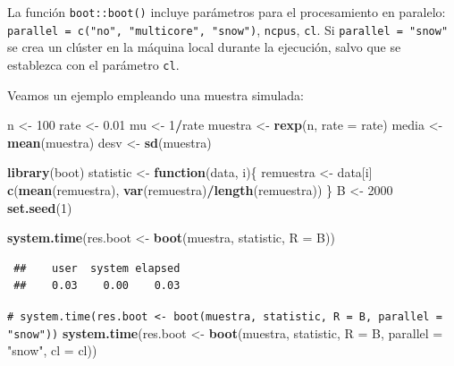 \documentclass[
  spanish,
  10pt,
]{book}
\newenvironment{Shaded}{\begin{snugshade}}{\end{snugshade}}
\newcommand{\AttributeTok}[1]{\textcolor[rgb]{0.13,0.29,0.53}{#1}}
\newcommand{\CommentTok}[1]{\textcolor[rgb]{0.56,0.35,0.01}{\textit{#1}}}
\newcommand{\ControlFlowTok}[1]{\textcolor[rgb]{0.13,0.29,0.53}{\textbf{#1}}}
\newcommand{\DecValTok}[1]{\textcolor[rgb]{0.00,0.00,0.81}{#1}}
\newcommand{\FloatTok}[1]{\textcolor[rgb]{0.00,0.00,0.81}{#1}}
\newcommand{\FunctionTok}[1]{\textcolor[rgb]{0.13,0.29,0.53}{\textbf{#1}}}
\newcommand{\NormalTok}[1]{#1}
\newcommand{\OtherTok}[1]{\textcolor[rgb]{0.56,0.35,0.01}{#1}}
\newcommand{\SpecialCharTok}[1]{\textcolor[rgb]{0.81,0.36,0.00}{\textbf{#1}}}
\newcommand{\StringTok}[1]{\textcolor[rgb]{0.31,0.60,0.02}{#1}}
\theoremstyle{break}
\theoremstyle{nonumberplain}
\renewcommand{\CommentTok}[1]{\textcolor[rgb]{0.41,0.41,0.41}{\texttt{#1}}}
\begin{document}
La función \texttt{boot::boot()} incluye parámetros para el procesamiento en paralelo:
\texttt{parallel\ =\ c("no",\ "multicore",\ "snow")}, \texttt{ncpus}, \texttt{cl}.
Si \texttt{parallel\ =\ "snow"} se crea un clúster en la máquina local durante la ejecución, salvo que se establezca con el parámetro \texttt{cl}.

Veamos un ejemplo empleando una muestra simulada:

\begin{Shaded}
\begin{Highlighting}[]
\NormalTok{n }\OtherTok{\textless{}{-}} \DecValTok{100}
\NormalTok{rate }\OtherTok{\textless{}{-}} \FloatTok{0.01}
\NormalTok{mu }\OtherTok{\textless{}{-}} \DecValTok{1}\SpecialCharTok{/}\NormalTok{rate}
\NormalTok{muestra }\OtherTok{\textless{}{-}} \FunctionTok{rexp}\NormalTok{(n, }\AttributeTok{rate =}\NormalTok{ rate)}
\NormalTok{media }\OtherTok{\textless{}{-}} \FunctionTok{mean}\NormalTok{(muestra)}
\NormalTok{desv }\OtherTok{\textless{}{-}} \FunctionTok{sd}\NormalTok{(muestra)}

\FunctionTok{library}\NormalTok{(boot)}
\NormalTok{statistic }\OtherTok{\textless{}{-}} \ControlFlowTok{function}\NormalTok{(data, i)\{}
\NormalTok{  remuestra }\OtherTok{\textless{}{-}}\NormalTok{ data[i]}
  \FunctionTok{c}\NormalTok{(}\FunctionTok{mean}\NormalTok{(remuestra), }\FunctionTok{var}\NormalTok{(remuestra)}\SpecialCharTok{/}\FunctionTok{length}\NormalTok{(remuestra))}
\NormalTok{\}}
\NormalTok{B }\OtherTok{\textless{}{-}} \DecValTok{2000}
\FunctionTok{set.seed}\NormalTok{(}\DecValTok{1}\NormalTok{)}

\FunctionTok{system.time}\NormalTok{(res.boot }\OtherTok{\textless{}{-}} \FunctionTok{boot}\NormalTok{(muestra, statistic, }\AttributeTok{R =}\NormalTok{ B))}
\end{Highlighting}
\end{Shaded}

\begin{verbatim}
 ##    user  system elapsed 
 ##    0.03    0.00    0.03
\end{verbatim}

\begin{Shaded}
\begin{Highlighting}[]
\CommentTok{\# system.time(res.boot \textless{}{-} boot(muestra, statistic, R = B, parallel = "snow"))}
\FunctionTok{system.time}\NormalTok{(res.boot }\OtherTok{\textless{}{-}} \FunctionTok{boot}\NormalTok{(muestra, statistic, }\AttributeTok{R =}\NormalTok{ B, }\AttributeTok{parallel =} \StringTok{"snow"}\NormalTok{, }\AttributeTok{cl =}\NormalTok{ cl))}
\end{Highlighting}
\end{Shaded}
\end{document}
